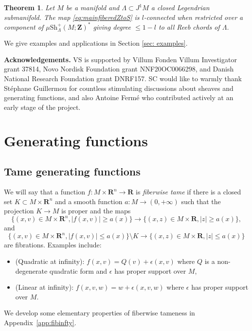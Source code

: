 \documentclass[12pt,a4paper]{article}
\numberwithin{equation}{section}
\newtheorem{thmintro}{Theorem}
\theoremstyle{definition}
\theoremstyle{remark}
\newcommand{\Z}{\mathbf{Z}}
\newcommand{\R}{\mathbf{R}}
\newcommand{\Sh}{\mathrm{Sh}}
\begin{document}
\begin{thmintro} \label{thm: Z to S}
   Let $M$ be a manifold and $\Lambda\subset J^1 M$ a closed Legendrian submanifold.
The map \eqref{eq:mainfiberedZtoS} is $l$-connected when restricted over a component of $\mu\Sh^+_\Lambda(M;\Z)^*$
giving degree $\leq 1-l$ to all Reeb chords of $\Lambda$.
\end{thmintro}

We give examples and applications in Section \ref{sec: examples}.

\vspace{2mm}
{\bf Acknowledgements.}  VS is supported by Villum Fonden Villum Investigator grant 37814, Novo Nordisk Foundation grant NNF20OC0066298, and Danish National Research Foundation grant DNRF157.
SC would like to warmly thank Stéphane Guillermou for countless stimulating discussions about sheaves and generating functions, and also Antoine Fermé who contributed actively at an early stage of the project.
\section{Generating functions}\label{sec:GF}

\subsection{Tame generating functions}
We will say that a function $f: M \times \R^n \to \R$ is {\em fiberwise tame} if there is a closed set $K\subset M\times \R^n$ and a smooth function $a:M\to (0,+\infty)$
such that the projection $K\to M$ is proper and the maps
\[\{(x,v)\in M \times \R^n, |f(x,v)|\geq a(x)\} \to \{(x,z)\in M\times \R, |z|\geq a(x)\},\]
and
\[\{(x,v)\in M \times \R^n, |f(x,v)|\leq a(x)\} \setminus K \to \{(x,z)\in M\times \R, |z|\leq a(x)\}\]
are fibrations. Examples include:
\begin{itemize}
\item (Quadratic at infinity): $f(x,v)=Q(v)+\epsilon(x,v)$ where $Q$ is a non-degenerate quadratic form and $\epsilon$ has proper support over $M$,
\item (Linear at infinity): $f(x,v,w)=w+\epsilon(x,v,w)$ where $\epsilon$ has proper support over $M$.
\end{itemize}

We develop some elementary properties of fiberwise tameness in Appendix~\ref{app:fibinfty}.
\end{document}

